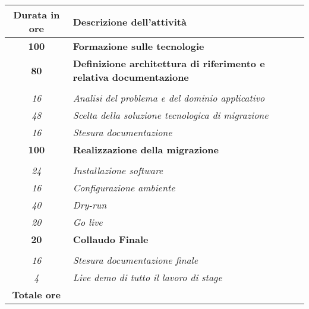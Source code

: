 

\begin{tabularx}{\textwidth}{|c|X|}
	\hline
	\textbf{Durata in ore} & \textbf{Descrizione dell'attività} \\\hline
	
	\textbf{100} & \textbf{Formazione sulle tecnologie} \\	 
    \hline
    
    \textbf{80} & \textbf{Definizione architettura di riferimento e relativa documentazione} \\ \hdashline 
    \multirow{3}{0cm}\\ 
    \textit{16} & 
    \textit{Analisi del problema e del dominio applicativo} \\
    \textit{48} & 
    \textit{Scelta della soluzione tecnologica di migrazione} \\
    \textit{16} & 
    \textit{Stesura documentazione} \\
    \hline

    \textbf{100} & \textbf{Realizzazione della migrazione} \\ \hdashline 
    \multirow{3}{0cm}\\ 
    \textit{24} & 
    \textit{Installazione software} \\
    \textit{16} & 
    \textit{Configurazione ambiente} \\
    \textit{40} & 
    \textit{Dry-run} \\
    \textit{20} & 
    \textit{Go live} \\
    \hline
    
    \textbf{20} & \textbf{Collaudo Finale}  \\ \hdashline 
    \multirow{4}{0cm}\\ 
    \textit{16} & 
    \textit{Stesura documentazione finale} \\
    \textit{4} & 
    \textit{Live demo di tutto il lavoro di stage} \\
    \hline
	
	\textbf{Totale ore} & \multicolumn{1}{|c|}{\textbf{\totaleOre}} \\\hline
	
	
\end{tabularx}